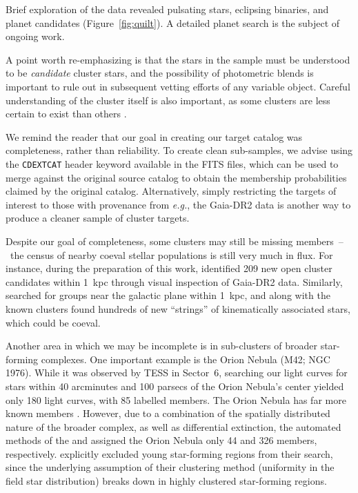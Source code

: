 \documentclass[12pt,twocolumn,tighten]{aastex62}
\begin{document}
Brief exploration of the data revealed pulsating stars, eclipsing
binaries, and planet candidates (Figure~\ref{fig:quilt}).  A detailed planet 
search is the
subject of ongoing work.

A point worth re-emphasizing is that the stars in the
sample must be understood to be {\it candidate} cluster stars, and the
possibility of photometric blends is important to rule out in
subsequent vetting efforts of any variable object.  Careful
understanding of the cluster itself is also important, as some
clusters are less certain to exist than others \citep[{\it
e.g.}, the infra-red clusters identified by][]{froebrich_FSR_2007}.

We remind the reader that our goal in creating our target catalog was
completeness, rather than reliability.  To create clean sub-samples, we
advise using the \texttt{CDEXTCAT} header keyword available in the
FITS files, which can be used to merge against the original source
catalog to obtain the membership probabilities claimed by the original
catalog.  Alternatively, simply restricting the targets of interest to
those with provenance from {\it e.g.}, the Gaia-DR2 data is another
way to produce a cleaner sample of cluster targets.

Despite our goal of completeness, some clusters may still be missing
members~--~the census of nearby coeval stellar populations is still
very much in flux. For instance, during the preparation of this work,
\citet{sim_open_2019} identified 209 new open cluster candidates
within 1~kpc through visual inspection of Gaia-DR2 data.  Similarly,
\citet{kounkel_untangling_2019} searched for groups near
the galactic plane within 1~kpc, and along with the known clusters
found hundreds of new ``strings'' of kinematically associated stars, which
could be coeval.

Another area in which we may be incomplete is in sub-clusters
of broader star-forming complexes. One important example is
the Orion Nebula (M42; NGC 1976).  While it was observed by TESS in
Sector~6, searching our light curves for stars within 40 arcminutes
and 100 parsecs of the Orion Nebula's center yielded only 180 light
curves, with 85 labelled members.  The Orion Nebula has far more known
members \citep{jones_proper_1988}.  However, due to a combination of
the spatially distributed nature of the broader complex, as well as
differential extinction, the automated methods of the
\citet{Kharchenko_et_al_2013} and \citet{dias_proper_2014} assigned
the Orion Nebula only 44 and 326 members, respectively.
\citet{cantat-gaudin_gaia_2018} explicitly excluded young star-forming
regions from their search, since the underlying assumption of their
clustering method (uniformity in the field star distribution) breaks
down in highly clustered star-forming regions.
\end{document}
